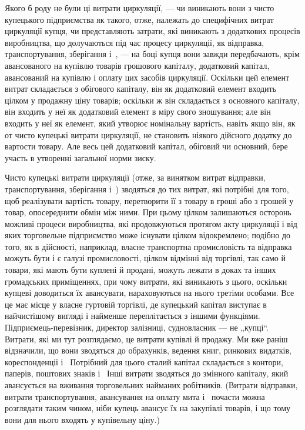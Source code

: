 
Якого б роду не були ці витрати циркуляції, — чи виникають
вони з чисто купецького підприємства як такого, отже, належать
до специфічних витрат циркуляції купця, чи представляють
затрати, які виникають з додаткових процесів виробництва, що
долучаються під час процесу циркуляції, як відправка, транспортування,
зберігання і~, — на боці купця вони завжди передбачають,
крім авансованого на купівлю товарів грошового капіталу,
додатковий капітал, авансований на купівлю і оплату цих
засобів циркуляції. Оскільки цей елемент витрат складається
з обігового капіталу, він як додатковий елемент входить цілком
у продажну ціну товарів; оскільки ж він складається з основного
капіталу, він входить у неї як додатковий елемент в міру
свого зношування; але він входить у неї як елемент, який утворює
номінальну вартість, навіть якщо він, як от чисто купецькі
витрати циркуляції, не становить ніякого дійсного додатку до
вартости товару. Але весь цей додатковий капітал, обіговий
чи основний, бере участь в утворенні загальної норми зиску.

Чисто купецькі витрати циркуляції (отже, за винятком витрат
відправки, транспортування, зберігання і~) зводяться до тих
витрат, які потрібні для того, щоб реалізувати вартість товару,
перетворити її з товару в гроші або з грошей у товар, опосереднити
обмін між ними. При цьому цілком залишаються осторонь
можливі процеси виробництва, які продовжуються протягом
акту циркуляції і від яких торговельне підприємство може
існувати цілком відокремлено; подібно до того, як в дійсності,
наприклад, власне транспортна промисловість та відправка можуть
бути і є галузі промисловості, цілком відмінні від торгівлі,
так само й товари, які мають бути куплені й продані,
можуть лежати в доках та інших громадських приміщеннях, при
чому витрати, які виникають з цього, оскільки купцеві доводиться
їх авансувати, нараховуються на нього третіми особами.
Все це має місце у власне гуртовій торгівлі, де купецький
капітал виступає в найчистішому вигляді і найменше переплітається
з іншими функціями. Підприємець-перевізник, директор
залізниці, судновласник — не „купці“. Витрати, які ми тут розглядаємо,
це витрати купівлі й продажу. Ми вже раніш відзначили,
що вони зводяться до обрахунків, ведення книг, ринкових
видатків, кореспонденції і~ Потрібний для цього сталий
капітал складається з контори, паперів, поштових знаків
і~ Інші витрати зводяться до змінного капіталу, який авансується
на вживання торговельних найманих робітників. (Витрати
відправки, витрати транспортування, авансування на оплату
мита і~ почасти можна розглядати таким чином, ніби купець
авансує їх на закупівлі товарів, і що тому вони для нього входять
у купівельну ціну.)

